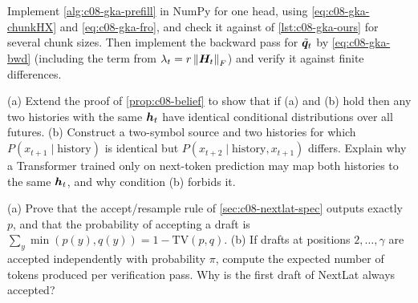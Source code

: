 \begin{exercise}\label{ex:c08-ex-code}
Implement \cref{alg:c08-gka-prefill} in NumPy for one head, using \eqref{eq:c08-gka-chunkHX} and
\eqref{eq:c08-gka-fro}, and check it against  of \cref{lst:c08-gka-ours} for
several chunk sizes. Then implement the backward pass for $\tilde{\bm{q}}_t$ by \eqref{eq:c08-gka-bwd}
(including the term from $\lambda_t=r\left\lVert \bm{H}_t\right\rVert_F$) and verify it against finite differences.
\end{exercise}

\begin{exercise}\label{ex:c08-ex-belief}
(a) Extend the proof of \cref{prop:c08-belief} to show that if (a) and (b) hold then any two histories
with the same $\bm{h}_t$ have identical conditional distributions over all futures. (b) Construct a
two-symbol source and two histories for which $P(x_{t+1}\mid\text{history})$ is identical but
$P(x_{t+2}\mid\text{history},x_{t+1})$ differs. Explain why a Transformer trained only on next-token
prediction may map both histories to the same $\bm{h}_t$, and why condition (b) forbids it.
\end{exercise}

\begin{exercise}\label{ex:c08-ex-spec}
(a) Prove that the accept/resample rule of \cref{sec:c08-nextlat-spec} outputs exactly $p$, and that
the probability of accepting a draft is $\sum_y\min(p(y),q(y))=1-\mathrm{TV}(p,q)$. (b) If drafts at
positions $2,\dots,\gamma$ are accepted independently with probability $\pi$, compute the expected
number of tokens produced per verification pass. Why is the first draft of NextLat always accepted?
\end{exercise}
